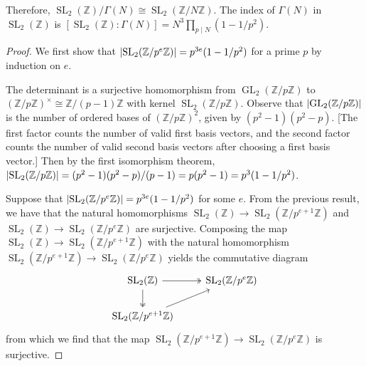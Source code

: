 \documentclass[10pt,leqno]{article}
\DeclareMathOperator{\GL}{GL}
\DeclareMathOperator{\SL}{SL}
\begin{document}
Therefore, $\SL_2(\mathbb{Z})/\varGamma(N)\cong \SL_2(\mathbb{Z}/N\mathbb{Z})$. The index of $\varGamma(N)$ in $\SL_2(\mathbb{Z})$ is $[\SL_2(\mathbb{Z}): \varGamma(N)] = N^3\prod_{p\mid N}(1-1/p^2)$.
\begin{proof}
    We first show that $\abs{\SL_2(\mathbb{Z}/p^e\mathbb{Z})} = p^{3e}(1-1/p^2)$ for a prime $p$ by induction on $e$.

    The determinant is a surjective homomorphism from $\GL_2(\mathbb{Z}/p\mathbb{Z})$ to $(\mathbb{Z}/p\mathbb{Z})^\times\cong \mathbb{Z}/(p-1)\mathbb{Z}$ with kernel $\SL_2(\mathbb{Z}/p\mathbb{Z})$. Observe that $\abs{\GL_2(\mathbb{Z}/p\mathbb{Z})}$ is the number of ordered bases of $(\mathbb{Z}/p\mathbb{Z})^2$, given by $(p^2-1)(p^2-p)$. [The first factor counts the number of valid first basis vectors, and the second factor counts the number of valid second basis vectors after choosing a first basis vector.] Then by the first isomorphism theorem, $\abs{\SL_2(\mathbb{Z}/p\mathbb{Z})} = (p^2-1)(p^2-p)/(p-1) = p(p^2-1) = p^3(1-1/p^2)$.
    
    Suppose that $\abs{\SL_2(\mathbb{Z}/p^e\mathbb{Z})} = p^{3e}(1-1/p^2)$ for some $e$. From the previous result, we have that the natural homomorphisms $\SL_2(\mathbb{Z})\to \SL_2(\mathbb{Z}/p^{e+1}\mathbb{Z})$ and $\SL_2(\mathbb{Z})\to \SL_2(\mathbb{Z}/p^e\mathbb{Z})$ are surjective. Composing the map $\SL_2(\mathbb{Z})\to \SL_2(\mathbb{Z}/p^{e+1}\mathbb{Z})$ with the natural homomorphism $\SL_2(\mathbb{Z}/p^{e+1}\mathbb{Z})\to \SL_2(\mathbb{Z}/p^e\mathbb{Z})$ yields the commutative diagram \[\begin{tikzcd}
        {\SL_2(\mathbb{Z})} & {\SL_2(\mathbb{Z}/p^e\mathbb{Z})} \\
        {\SL_2(\mathbb{Z}/p^{e+1}\mathbb{Z})}
        \arrow[from=2-1, to=1-2]
        \arrow[two heads, from=1-1, to=2-1]
        \arrow[two heads, from=1-1, to=1-2]
    \end{tikzcd}\] from which we find that the map $\SL_2(\mathbb{Z}/p^{e+1}\mathbb{Z})\to \SL_2(\mathbb{Z}/p^e\mathbb{Z})$ is surjective.


\end{proof}
\end{document}
